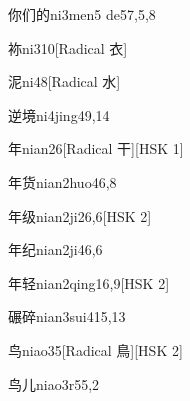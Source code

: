 \begin{entry}{你们的}{ni3men5 de5}{7,5,8}
\end{entry}

\begin{entry}{袮}{ni3}{10}[Radical 衣]
\end{entry}

\begin{entry}{泥}{ni4}{8}[Radical 水]
\end{entry}

\begin{entry}{逆境}{ni4jing4}{9,14}
\end{entry}

\begin{entry}{年}{nian2}{6}[Radical 干][HSK 1]
\end{entry}

\begin{entry}{年货}{nian2huo4}{6,8}
\end{entry}

\begin{entry}{年级}{nian2ji2}{6,6}[HSK 2]
\end{entry}

\begin{entry}{年纪}{nian2ji4}{6,6}
\end{entry}

\begin{entry}{年轻}{nian2qing1}{6,9}[HSK 2]
\end{entry}

\begin{entry}{碾碎}{nian3sui4}{15,13}
\end{entry}

\begin{entry}{鸟}{niao3}{5}[Radical 鳥][HSK 2]
\end{entry}

\begin{entry}{鸟儿}{niao3r5}{5,2}
\end{entry}


